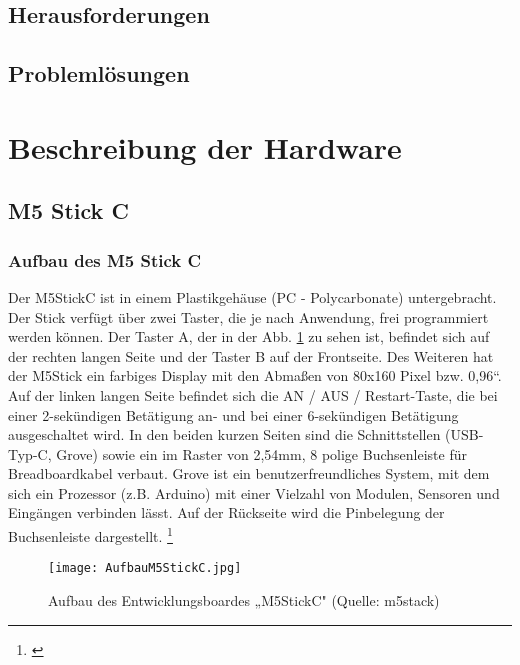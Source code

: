 \documentclass[a4paper,12pt]{article}
\begin{document}
\subsection{Herausforderungen}

\subsection{Problemlösungen}

\section{Beschreibung der Hardware}
\subsection{M5 Stick C}
\subsubsection{Aufbau des M5 Stick C}
Der M5StickC ist in einem Plastikgehäuse (PC - Polycarbonate) untergebracht. Der Stick verfügt über zwei Taster, die je nach Anwendung, frei programmiert werden können. Der Taster A, der in der Abb. \ref{AufbauM5StickC} zu sehen ist, befindet sich auf der rechten langen Seite und der Taster B auf der Frontseite. Des Weiteren hat der M5Stick ein farbiges Display mit den Abmaßen von 80x160 Pixel bzw. 0,96“. Auf der linken langen Seite befindet sich die AN / AUS / Restart-Taste, die bei einer 2-sekündigen Betätigung an- und bei einer 6-sekündigen Betätigung ausgeschaltet wird. In den beiden kurzen Seiten sind die Schnittstellen (USB-Typ-C, Grove) sowie ein im Raster von 2,54mm, 8 polige Buchsenleiste für Breadboardkabel verbaut. Grove ist ein benutzerfreundliches System, mit dem sich ein Prozessor (z.B. Arduino) mit einer Vielzahl von Modulen, Sensoren und Eingängen verbinden lässt. Auf der Rückseite wird die Pinbelegung der Buchsenleiste dargestellt. \footnote{\cite{M5STACK.}}

\begin{figure}[H]	%
\begin{center}
\texttt{[image: AufbauM5StickC.jpg]}
\caption{Aufbau des Entwicklungsboardes „M5StickC" (Quelle: m5stack)}
\label{AufbauM5StickC}
\end{center}
\end{figure}
\end{document}
